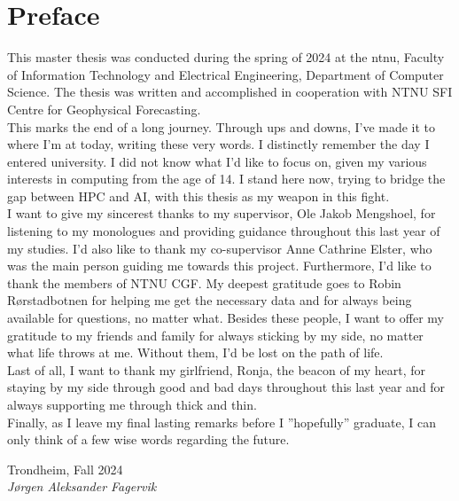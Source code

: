 \chapter*{Preface}

This master thesis was conducted during the spring of 2024 at the \acrfull{ntnu}, Faculty of Information Technology and Electrical Engineering, Department of Computer Science. The thesis was written and accomplished in cooperation with NTNU SFI Centre for Geophysical Forecasting. \\

This marks the end of a long journey. Through ups and downs, I've made it to where I'm at today, writing these very words. I distinctly remember the day I entered university. I did not know what I'd like to focus on, given my various interests in computing from the age of 14. I stand here now, trying to bridge the gap between HPC and AI, with this thesis as my weapon in this fight. \\

I want to give my sincerest thanks to my supervisor, Ole Jakob Mengshoel, for listening to my monologues and providing guidance throughout this last year of my studies. I'd also like to thank my co-supervisor Anne Cathrine Elster, who was the main person guiding me towards this project. Furthermore, I'd like to thank the members of NTNU CGF. My deepest gratitude goes to Robin Rørstadbotnen for helping me get the necessary data and for always being available for questions, no matter what. Besides these people, I want to offer my gratitude to my friends and family for always sticking by my side, no matter what life throws at me. Without them, I'd be lost on the path of life. \\

Last of all, I want to thank my girlfriend, Ronja, the beacon of my heart, for staying by my side through good and bad days throughout this last year and for always supporting me through thick and thin.\\

Finally, as I leave my final lasting remarks before I ''hopefully'' graduate, I can only think of a few wise words regarding the future.

\begin{flushright}
Trondheim, Fall 2024  \\
\textit{Jørgen Aleksander Fagervik}
\end{flushright}